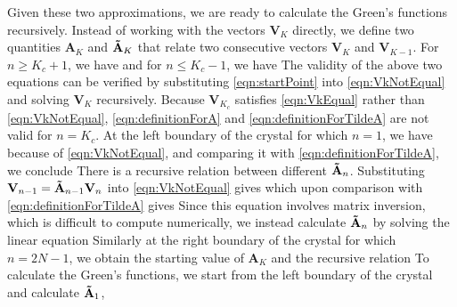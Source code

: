 Given these two approximations, we are ready to calculate the Green's functions
 recursively. Instead of working with the vectors $\mathbf{V}_{K}$ directly, we define two quantities 
$\mathbf{A}_{K}$ and $\mathbf{\Tilde{A}}_{K} $ that relate
two consecutive vectors $\mathbf{V}_{K}$ and $\mathbf{V}_{K-1}$. For $n \ge K_c + 1$, we have
and for $n \le K_c - 1$, we have
The validity of the above two equations can be verified by substituting \autoref{eqn:startPoint} into
 \autoref{eqn:VkNotEqual} and solving $\mathbf{V}_{K}$ recursively. Because $\mathbf{V}_{K_c}$ satisfies 
\autoref{eqn:VkEqual} rather than \autoref{eqn:VkNotEqual}, \autoref{eqn:definitionForA} and 
\autoref{eqn:definitionForTildeA} are not valid for $n = K_c$. At the left boundary of the crystal for which $n=1$, we have
because of \autoref{eqn:VkNotEqual}, and comparing it with \autoref{eqn:definitionForTildeA}, we conclude 
There is a recursive relation between different $\mathbf{\Tilde{A}}_{n}$. Substituting 
$\mathbf{V}_{n-1} = \mathbf{\Tilde{A}}_{n-1} \mathbf{V}_{n} $ into \autoref{eqn:VkNotEqual} gives
which upon comparison with \autoref{eqn:definitionForTildeA} gives
Since this equation involves matrix inversion, which is difficult to compute numerically, we 
instead calculate
$\mathbf{\Tilde{A}}_{n}$ by solving the linear equation
Similarly at the right boundary of the crystal for which $n=2N-1$, we obtain the starting value of $\mathbf{A}_{K}$
and the recursive relation
To calculate the Green's functions, we  
start from the left boundary of the crystal and calculate $\mathbf{\Tilde{A}}_{1}$, 
